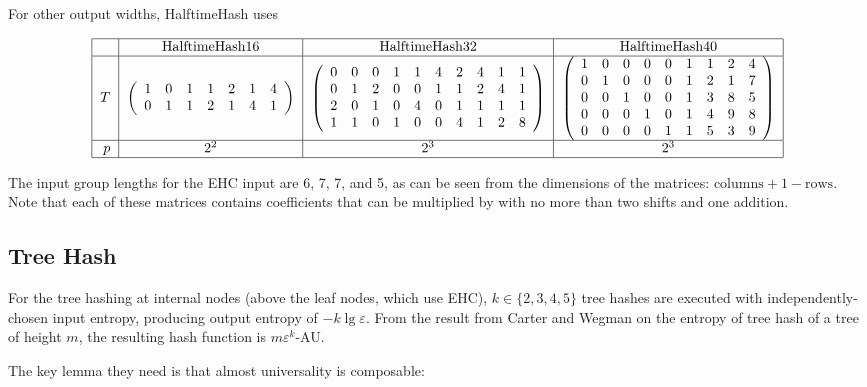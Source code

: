 \documentclass{llncs}
\begin{document}
For other output widths, HalftimeHash uses

\[
\begin{tabular}{|r|c|c|c|}
  \hline  & HalftimeHash16 & HalftimeHash32 & HalftimeHash40 \\
  \hline $T$ &
$\left(
\begin{array}{rrrrrrrrrrrr}
  1 & 0 & 1 & 1 & 2 & 1 & 4\\
  0 & 1 & 1 & 2 & 1 & 4 & 1
\end{array}
\right)$
&
$\left(
\begin{array}{rrrrrrrrrr}
 0 & 0 & 0 & 1 & 1 & 4 & 2 & 4 & 1 & 1 \\
 0 & 1 & 2 & 0 & 0 & 1 & 1 & 2 & 4 & 1 \\
 2 & 0 & 1 & 0 & 4 & 0 & 1 & 1 & 1 & 1 \\
 1 & 1 & 0 & 1 & 0 & 0 & 4 & 1 & 2 & 8
\end{array}
\right)$
&
$\left(
\begin{array}{rrrrrrrrr}
 1 & 0 & 0 & 0 & 0 & 1 & 1 & 2 & 4\\
 0 & 1 & 0 & 0 & 0 & 1 & 2 & 1 & 7\\
 0 & 0 & 1 & 0 & 0 & 1 & 3 & 8 & 5\\
 0 & 0 & 0 & 1 & 0 & 1 & 4 & 9 & 8\\
 0 & 0 & 0 & 0 & 1 & 1 & 5 & 3 & 9
\end{array}
\right)$ \\
\hline $p$ & $2^2$ & $2^3$ & $2^3$ \\
\hline
\end{tabular}
\]

The input group lengths for the EHC input are 6, 7, 7, and 5, as can be seen from the dimensions of the matrices: $\text{columns} + 1 - \text{rows}$.
Note that each of these matrices contains coefficients that can be multiplied by with no more than two shifts and one addition.

\subsection{Tree Hash}

For the tree hashing at internal nodes (above the leaf nodes, which use EHC), $k \in \{2, 3, 4, 5\}$ tree hashes are executed with independently-chosen input entropy, producing output entropy of $-k \lg \varepsilon$.
From the result from Carter and Wegman on the entropy of tree hash of a tree of height $m$, the resulting hash function is $m\varepsilon^k$-AU.

The key lemma they need is that almost universality is composable:
\end{document}
